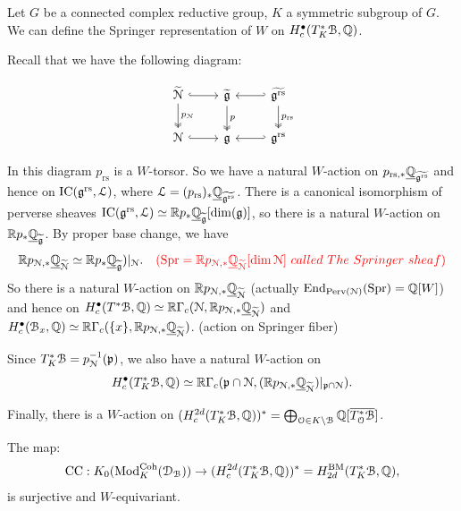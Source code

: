 \documentclass[12pt]{amsart}
\numberwithin{equation}{section}
\newcommand{\CN}{{\mathcal {N}}} \newcommand{\CO}{{\mathcal {O}}} \newcommand{\CP}{{\mathcal {P}}}
\newcommand{\fg}{\mathfrak{g}} \newcommand{\fh}{\mathfrak{h}} \newcommand{\fk}{\mathfrak{k}}
\newcommand{\End}{{\mathrm{End}}} \newcommand{\Aut}{{\mathrm{Aut}}}
\renewcommand{\bar}{\overline}
\renewcommand{\tilde}{\widetilde}
\begin{document}
Let $G$ be a connected complex reductive group, $K$ a symmetric subgroup of $G$. We can define the Springer representation of $W$ on $H^{\bullet}_c(T^*_{K}{\mathcal {B}},{\mathbb {Q}})$.

Recall that we have the following diagram:

\[
\begin{tikzcd}
  \tilde{\CN} \arrow[d,two heads,"p_{\CN}"] \arrow[r,hook] & \tilde{\fg} \arrow[d,two heads,"p"] & \tilde{\fg^{\mathrm{rs}}} \arrow[l,hook'] \arrow[d,two heads,"p_{\mathrm{rs}}"] \\
  \CN \arrow[r,hook] & \fg & \fg^{\mathrm{rs}} \arrow[l,hook']
\end{tikzcd}
\]

In this diagram $p_{\mathrm{rs}}$ is a $W$-torsor. So we have a natural $W$-action on $p_{\mathrm{rs},*}\underline{\BQ}_{\tilde{\fg^{\mathrm{rs}}}}$ and hence on $\mathrm{IC}(\fg^{\mathrm{rs}},\CL)$, where $\CL = (p_{\mathrm{rs}})_*\underline{\BQ}_{\tilde{\fg^{\mathrm{rs}}}}$. There is a canonical isomorphism of perverse sheaves $\mathrm{IC}(\fg^{\mathrm{rs}},\CL) \simeq \BR p_{*}\underline{\BQ}_{\tilde{\fg}}[\dim(\fg)]$, so there is a natural $W$-action on $\BR p_{*}\underline{\BQ}_{\tilde{\fg}}$. By proper base change, we have
\[
  \BR p_{\CN,*}\underline{\BQ}_{\tilde{\CN}} \simeq \BR p_{*}\underline{\BQ}_{\tilde{\fg}})|_{\CN}. \quad  \textcolor{red}{(\mathrm{Spr} = \BR p_{\CN,*}\underline{\BQ}_{\tilde{\CN}}[\dim \CN] \ called \ The \ Springer \ sheaf)}
\]
So there is a natural $W$-action on $\BR p_{\CN,*}\underline{\BQ}_{\tilde{\CN}}$ (actually $\End_{\mathrm{Perv(\CN)}}(\mathrm{Spr}) = \BQ[W]$) and hence on $H^{\bullet}_c(T^*\CB,\BQ) \simeq \BR \Gamma_c(\CN,\BR p_{\CN,*}\underline{\BQ}_{\tilde{\CN}})$ and $H^{\bullet}_c(\CB_x,\BQ) \simeq \BR \Gamma_c(\{ x \}, \BR p_{\CN,*}\underline{\BQ}_{\tilde{\CN}})$. (action on Springer fiber)

Since $T^*_{K}\CB = p_{\CN}^{-1}(\fp)$, we also have a natural $W$-action on 
\[
H^{\bullet}_c(T^*_{K}\CB,\BQ) \simeq \BR \Gamma_c(\fp \cap \CN,(\BR p_{\CN,*}\underline{\BQ}_{\tilde{\CN}})|_{\fp \cap \CN}).
\]

Finally, there is a $W$-action on $(H^{2d}_c(T^*_{K}\CB,\BQ))^* = \bigoplus_{\CO \in K \backslash \CB} \BQ[\bar{T^*_{\CO}\CB}]$.


\begin{thm}[Tanisaki]
  The map:
  \[
    \mathrm{CC}: K_0(\mathrm{Mod}^{\mathrm{Coh}}_{K}(\mathcal{D}_{\mathcal{B}})) \to (H^{2d}_c(T^*_{K}{\mathcal {B}},{\mathbb {Q}}))^* = H^{\mathrm{BM}}_{2d}(T^*_{K}{\mathcal {B}},{\mathbb {Q}}),
  \]
  is surjective and $W$-equivariant.
\end{thm}
\end{document}
